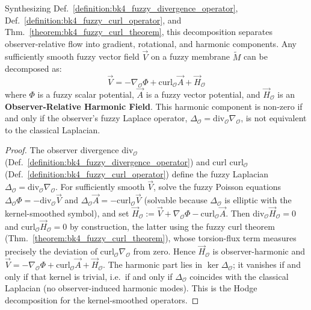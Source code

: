 \begin{theorem}
\label{theorem:bk4_fuzzy_helmholtz_decomposition}
Synthesizing Def.~\ref{definition:bk4_fuzzy_divergence_operator}, Def.~\ref{definition:bk4_fuzzy_curl_operator}, and Thm.~\ref{theorem:bk4_fuzzy_curl_theorem}, this decomposition separates observer-relative flow into gradient, rotational, and harmonic components.
Any sufficiently smooth fuzzy vector field $\vec{V}$ on a fuzzy membrane $\tilde{M}$ can be decomposed as:
\[
\vec{V} = -\nabla_{\mathcal{O}} \Phi + \text{curl}_{\mathcal{O}} \vec{A} + \vec{H}_{\mathcal{O}}
\]
where $\Phi$ is a fuzzy scalar potential, $\vec{A}$ is a fuzzy vector potential, and $\vec{H}_{\mathcal{O}}$ is an \textbf{Observer-Relative Harmonic Field}. This harmonic component is non-zero if and only if the observer's fuzzy Laplace operator, $\Delta_{\mathcal{O}} = \text{div}_{\mathcal{O}} \nabla_{\mathcal{O}}$, is not equivalent to the classical Laplacian.
\end{theorem}

\begin{proof}
\label{proof:bk4_fuzzy_helmholtz_decomposition}
\leavevmode
The observer divergence $\mathrm{div}_{\mathcal{O}}$ (Def.~\ref{definition:bk4_fuzzy_divergence_operator}) and curl $\mathrm{curl}_{\mathcal{O}}$ (Def.~\ref{definition:bk4_fuzzy_curl_operator}) define the fuzzy Laplacian $\Delta_{\mathcal{O}} = \mathrm{div}_{\mathcal{O}}\nabla_{\mathcal{O}}$. For sufficiently smooth $\vec{V}$, solve the fuzzy Poisson equations $\Delta_{\mathcal{O}}\Phi = -\mathrm{div}_{\mathcal{O}}\vec{V}$ and $\Delta_{\mathcal{O}}\vec{A} = -\mathrm{curl}_{\mathcal{O}}\vec{V}$ (solvable because $\Delta_{\mathcal{O}}$ is elliptic with the kernel-smoothed symbol), and set $\vec{H}_{\mathcal{O}} := \vec{V} + \nabla_{\mathcal{O}}\Phi - \mathrm{curl}_{\mathcal{O}}\vec{A}$. Then $\mathrm{div}_{\mathcal{O}}\vec{H}_{\mathcal{O}} = 0$ and $\mathrm{curl}_{\mathcal{O}}\vec{H}_{\mathcal{O}} = 0$ by construction, the latter using the fuzzy curl theorem (Thm.~\ref{theorem:bk4_fuzzy_curl_theorem}), whose torsion-flux term measures precisely the deviation of $\mathrm{curl}_{\mathcal{O}}\nabla_{\mathcal{O}}$ from zero. Hence $\vec{H}_{\mathcal{O}}$ is observer-harmonic and $\vec{V} = -\nabla_{\mathcal{O}}\Phi + \mathrm{curl}_{\mathcal{O}}\vec{A} + \vec{H}_{\mathcal{O}}$. The harmonic part lies in $\ker\Delta_{\mathcal{O}}$; it vanishes if and only if that kernel is trivial, i.e.\ if and only if $\Delta_{\mathcal{O}}$ coincides with the classical Laplacian (no observer-induced harmonic modes). This is the Hodge decomposition for the kernel-smoothed operators.
\end{proof}

